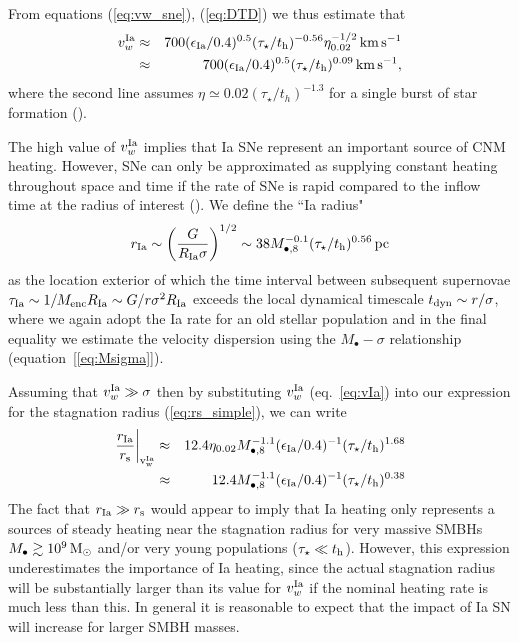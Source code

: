 \documentclass[usenatbib,fleqn]{mn2e}
\begin{document}
From equations (\ref{eq:vw_sne}), (\ref{eq:DTD}) we thus estimate that 
  \begin{eqnarray} 
    v_{w}^{\rm Ia} &\approx& 700(\epsilon_{\rm
      Ia}/0.4)^{0.5}(\tau_{\star}/t_{\rm h})^{-0.56}\eta_{0.02}^{-1/2}\,{\rm km
      \,s^{-1}} \nonumber \\
&\approx& 700(\epsilon_{\rm
      Ia}/0.4)^{0.5}(\tau_{\star}/t_{\rm h})^{0.09}\,{\rm km
      \,s^{-1}},
\label{eq:vIa}
  \end{eqnarray}
where the second line assumes $\eta\simeq 0.02 (\tau_{\star}/t_h)^{-1.3}$ for a single burst of star formation (\citealt{Ciotti+91}).

The high value of $v_{w}^{\rm Ia}$ implies that Ia SNe represent an important source of CNM heating.  However, SNe can only be approximated as supplying constant heating throughout space and time if the rate of SNe is rapid compared to the inflow time at the radius of interest (\citealt{ShcherbakovWong+:2014a}).  We define the ``Ia radius"
  \begin{align}
    r_{\rm Ia} \sim \left(\frac{G}{R_{\rm Ia}\sigma}\right)^{1/2} \sim
    38 M_{\bullet,8}^{-0.1}(\tau_{\star}/t_{\rm h})^{0.56}\,{\rm pc}
    \label{eq:rIa}
  \end{align}
as the location exterior of which the time interval between subsequent supernovae $\tau_{\rm Ia} \sim 1/M_{\rm enc}R_{\rm Ia} \sim G/r\sigma^{2}R_{\rm Ia}$ exceeds the local dynamical timescale $t_{\rm
dyn} \sim r/\sigma$, where we again adopt the Ia rate for an old stellar population and in the final equality we estimate the velocity dispersion using the $M_{\bullet}-\sigma$ relationship
(equation~[\ref{eq:Msigma}]).  

Assuming that $v_{w}^{\rm Ia} \gg \sigma$ then by substituting $v_{w}^{\rm Ia}$ (eq.~\ref{eq:vIa}) into our expression for the stagnation radius (\ref{eq:rs_simple}), we can write
\begin{eqnarray}
\left.\frac{r_{\rm Ia}}{r_{\rm s}}\right|_{\rm v_{w}^{\rm Ia}} &\approx& 12.4\eta_{0.02} M_{\bullet,8}^{-1.1}(\epsilon_{\rm Ia}/0.4)^{-1}(\tau_{\star}/t_{\rm h})^{1.68} \nonumber \\
&\approx& 12.4M_{\bullet,8}^{-1.1}(\epsilon_{\rm Ia}/0.4)^{-1}(\tau_{\star}/t_{\rm h})^{0.38}
\end{eqnarray}
The fact that $r_{\rm Ia} \gg r_{\rm s}$ would appear to imply that Ia heating only represents a sources of steady heating near the stagnation radius for very massive SMBHs $M_{\bullet} \gtrsim 10^9 \,{\rm M_\odot}$ and/or very young populations ($\tau_{\star} \ll t_{\rm h}$).  However, this expression underestimates the importance of Ia heating, since the actual stagnation radius will be substantially larger than its value for $v_{w}^{\rm Ia}$ if the nominal heating rate is much less than this.  In general it is reasonable to expect that the impact of Ia SN will increase for larger SMBH masses.
\end{document}
